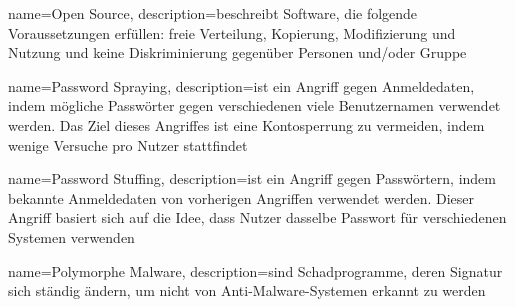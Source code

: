

 {
    name={Open Source},
    description={beschreibt Software, die folgende Voraussetzungen erfüllen: freie Verteilung, Kopierung, Modifizierung und Nutzung und keine Diskriminierung gegenüber Personen und/oder Gruppe \citep{OpenSource_Def}}}


 {
    name={Password Spraying},
    description={ist ein Angriff gegen Anmeldedaten, indem mögliche Passwörter gegen verschiedenen viele Benutzernamen verwendet werden. Das Ziel dieses Angriffes ist eine Kontosperrung zu vermeiden, indem wenige Versuche pro Nutzer stattfindet \citep{Swathi_spraxy}}}

 {
    name={Password Stuffing},
    description={ist ein Angriff gegen Passwörtern, indem bekannte Anmeldedaten von vorherigen Angriffen verwendet werden. Dieser Angriff basiert sich auf die Idee, dass Nutzer dasselbe Passwort für verschiedenen Systemen verwenden \citep{Nguyen_stuffing}}}
    


 {
    name={Polymorphe Malware},
    description={sind Schadprogramme, deren Signatur sich ständig ändern, um nicht von Anti-Malware-Systemen erkannt zu werden \citep{Syuhada_Polymorphic}}   
    }

